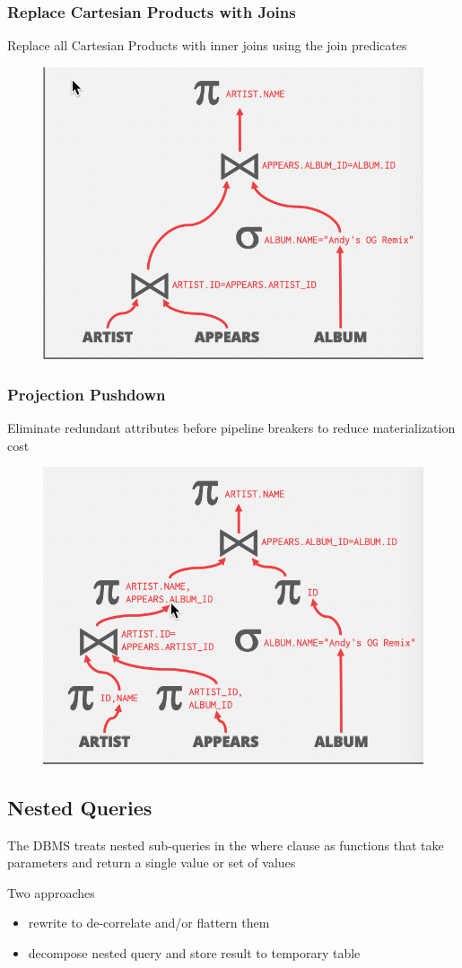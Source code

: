 \documentclass[11pt]{article}
\begin{document}
\subsubsection{Replace Cartesian Products with Joins}
\label{sec:org9dbd718}
Replace all Cartesian Products with inner joins using the join predicates
\begin{figure}[htbp]
\centering
\includegraphics[width=.5\textwidth]{../images/15445/41.png}
\label{}
\end{figure}
\subsubsection{Projection Pushdown}
\label{sec:orgf86b42c}
Eliminate redundant attributes before pipeline breakers to reduce materialization cost
\begin{figure}[htbp]
\centering
\includegraphics[width=.5\textwidth]{../images/15445/42.png}
\label{}
\end{figure}
\subsection{Nested Queries}
\label{sec:org375cd7c}
The DBMS treats nested sub-queries in the where clause as functions that take parameters and
return a single value or set of values

Two approaches
\begin{itemize}
\item rewrite to de-correlate and/or flattern them
\item decompose nested query and store result to temporary table
\end{itemize}
\end{document}
